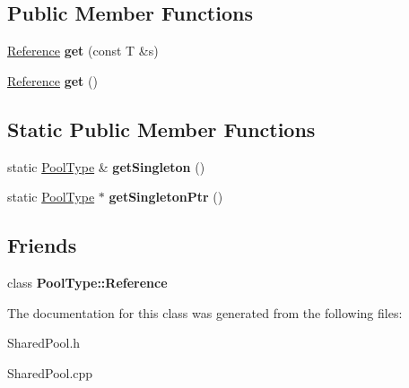\subsection*{Public Member Functions}
\begin{DoxyCompactItemize}
\item 
\hyperlink{classSharedPool_1_1Reference}{Reference} {\bfseries get} (const T \&s)\hypertarget{classSharedPool_ac91a2ad764c061c44a8f56c5697cc875}{}\label{classSharedPool_ac91a2ad764c061c44a8f56c5697cc875}

\item 
\hyperlink{classSharedPool_1_1Reference}{Reference} {\bfseries get} ()\hypertarget{classSharedPool_a5b449077623391514e80cd97e0958827}{}\label{classSharedPool_a5b449077623391514e80cd97e0958827}

\end{DoxyCompactItemize}
\subsection*{Static Public Member Functions}
\begin{DoxyCompactItemize}
\item 
static \hyperlink{classSharedPool}{Pool\+Type} \& {\bfseries get\+Singleton} ()\hypertarget{classSharedPool_aa1238db48a43631130e516ea9af3a745}{}\label{classSharedPool_aa1238db48a43631130e516ea9af3a745}

\item 
static \hyperlink{classSharedPool}{Pool\+Type} $\ast$ {\bfseries get\+Singleton\+Ptr} ()\hypertarget{classSharedPool_a738e2f34d7d284f47f079cd3d13ceec4}{}\label{classSharedPool_a738e2f34d7d284f47f079cd3d13ceec4}

\end{DoxyCompactItemize}
\subsection*{Friends}
\begin{DoxyCompactItemize}
\item 
class {\bfseries Pool\+Type\+::\+Reference}\hypertarget{classSharedPool_ad21ccc1b79dbba80df4a28bb348054f4}{}\label{classSharedPool_ad21ccc1b79dbba80df4a28bb348054f4}

\end{DoxyCompactItemize}


The documentation for this class was generated from the following files\+:\begin{DoxyCompactItemize}
\item 
Shared\+Pool.\+h\item 
Shared\+Pool.\+cpp\end{DoxyCompactItemize}
